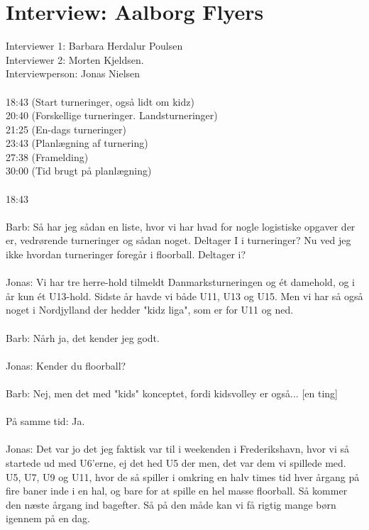 \chapter{Interview: Aalborg Flyers}\label{ch:appClabel}
Interviewer 1: Barbara Herdalur Poulsen\\
Interviewer 2: Morten Kjeldsen.\\
Interviewperson: Jonas Nielsen
\\
\\
18:43 (Start turneringer, også lidt om kidz)\\
20:40 (Forskellige turneringer. Landsturneringer)\\
21:25 (En-dags turneringer)\\
23:43 (Planlægning af turnering)\\
27:38 (Framelding)\\
30:00 (Tid brugt på planlægning)
\\
\\
18:43
\\\\
Barb: Så har jeg sådan en liste, hvor vi har hvad for nogle logistiske opgaver der er, vedrørende turneringer og sådan noget. Deltager I i turneringer? Nu ved jeg ikke hvordan turneringer foregår i floorball. Deltager i?
\\\\
Jonas: Vi har tre herre-hold tilmeldt Danmarksturneringen og ét damehold, og i år kun ét U13-hold. Sidste år havde vi både U11, U13 og U15. Men vi har så også noget i Nordjylland der hedder "kidz liga", som er for U11 og ned.
\\\\
Barb: Nårh ja, det kender jeg godt.
\\\\
Jonas: Kender du floorball?
\\\\
Barb: Nej, men det med "kids" konceptet, fordi kidsvolley er også... [en ting]
\\\\
På samme tid: Ja.
\\\\
Jonas: Det var jo det jeg faktisk var til i weekenden i Frederikshavn, hvor vi så startede ud med U6'erne, ej det hed U5 der men, det var dem vi spillede med. U5, U7, U9 og U11, hvor de så spiller i omkring en halv times tid hver årgang på fire baner inde i en hal, og bare for at spille en hel masse floorball. Så kommer den næste årgang ind bagefter. Så på den måde kan vi få rigtig mange børn igennem på en dag. 
